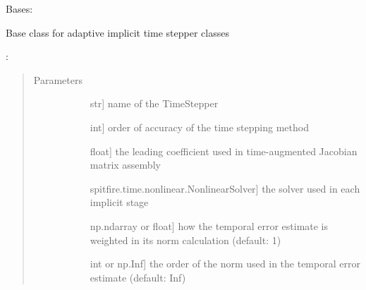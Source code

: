 \documentclass[letterpaper,10pt,english]{sphinxmanual}
\begin{document}
\begin{fulllineitems}
\label{\detokenize{spitfire.time.methods:spitfire.time.methods.AdaptiveImplicitTimeStepper}}
Bases: {\hyperref[\detokenize{spitfire.time.methods:spitfire.time.methods.ImplicitTimeStepper}]{}}

Base class for adaptive implicit time stepper classes

:
\begin{quote}\begin{description}
\item[{Parameters}] \leavevmode\begin{description}
\item[{}] \leavevmode{[}str{]}
name of the TimeStepper

\item[{}] \leavevmode{[}int{]}
order of accuracy of the time stepping method

\item[{}] \leavevmode{[}float{]}
the leading coefficient used in time-augmented Jacobian matrix assembly

\item[{}] \leavevmode{[}spitfire.time.nonlinear.NonlinearSolver{]}
the solver used in each implicit stage

\item[{}] \leavevmode{[}np.ndarray or float{]}
how the temporal error estimate is weighted in its norm calculation (default: 1)

\item[{}] \leavevmode{[}int or np.Inf{]}
the order of the norm used in the temporal error estimate (default: Inf)

\end{description}

\end{description}\end{quote}


\end{fulllineitems}
\end{document}
